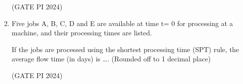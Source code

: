 \documentclass[journal,12pt,onecolumn]{IEEEtran}
\theoremstyle{remark}
\begin{document}
\begin{enumerate}
\hfill (GATE PI 2024)

\item Five jobs A, B, C, D and E are available at time t= 0 for processing at a machine, and their processing times are listed.



If the jobs are processed using the shortest processing time (SPT) rule, the average flow time (in days) is \dots . (Rounded off to 1 decimal place)

\hfill (GATE PI 2024)













\end{enumerate}
\end{document}
